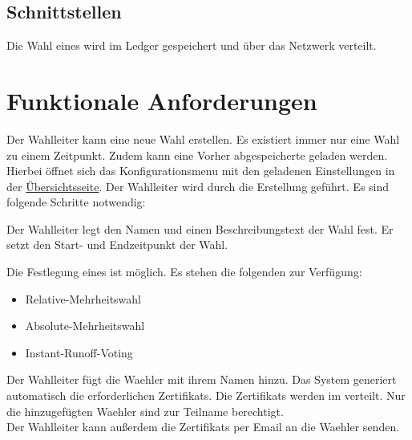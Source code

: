 \documentclass[parskip=full,11pt,twoside]{scrartcl}
\begin{document}
\subsection{Schnittstellen}
Die \gls{Wahl} eines  wird im \gls{Ledger} gespeichert und über das \gls{Netzwerk} verteilt.

\section{Funktionale Anforderungen}

Der \gls{Wahlleiter} kann eine neue \gls{Wahl} erstellen. Es existiert immer nur eine \gls{Wahl} zu einem Zeitpunkt.
Zudem kann eine Vorher abgespeicherte  geladen werden. Hierbei öffnet sich das \gls{Konfigurationsmenu} mit den geladenen Einstellungen in der \hyperref[fig:wlltr-done]{Übersichtsseite}.
Der \gls{Wahlleiter} wird durch die Erstellung geführt. Es sind folgende Schritte notwendig:

Der \gls{Wahlleiter} legt den Namen und einen Beschreibungstext der \gls{Wahl} fest.
Er setzt den Start- und Endzeitpunkt der \gls{Wahl}.

Die Festlegung eines  ist möglich. Es stehen die folgenden zur Verfügung:
\begin{itemize}
	\item \gls{Relative-Mehrheitswahl}
	\item \gls{Absolute-Mehrheitswahl}
	\item \gls{Instant-Runoff-Voting}
\end{itemize}

Der \gls{Wahlleiter} fügt die \gls{Waehler} mit ihrem Namen hinzu. Das System generiert automatisch die erforderlichen \glspl{Zertifikat}. Die \glspl{Zertifikat} werden im  verteilt. Nur die hinzugefügten \gls{Waehler} sind zur Teilname berechtigt. \\
Der \gls{Wahlleiter} kann außerdem die \glspl{Zertifikat} per Email an die \gls{Waehler} senden.
\end{document}
